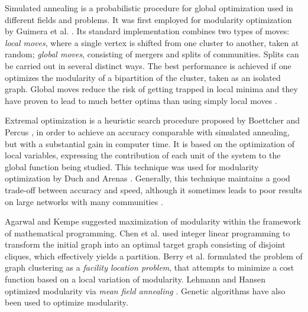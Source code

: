 Simulated annealing \cite{Kirkpatrick1983} is a probabilistic procedure for global optimization
used in different fields and problems. It was first employed for modularity optimization by Guimera et al. \cite{guimera2004}. Its
standard implementation combines two types of moves: {\em local moves}, where a single vertex is shifted from one cluster to another, taken
at random; {\em global moves}, consisting of mergers and splits of communities. Splits can be carried out in several distinct ways. The best
performance is achieved if one optimizes the modularity of a bipartition of the cluster, taken as an isolated graph. Global moves reduce the
risk of getting trapped in local minima and they have proven to lead to much better optima than using simply local moves
\cite{Massen_2005}.

 Extremal optimization is a heuristic search procedure proposed by Boettcher and Percus
\cite{Boettcher}, in order to achieve an accuracy comparable with simulated annealing, but with a substantial gain in computer time. It
is based on the optimization of local variables, expressing the contribution of each unit of the system to the global function being
studied.
This technique was used for modularity optimization by Duch and Arenas \cite{PhysRevE.72.}. Generally, this technique maintains a good
trade-off between accuracy and speed, although it sometimes leads to poor results on large networks with many communities
\cite{Fortunato201075}.

 Agarwal and Kempe \cite{Agarwal72} suggested maximization of modularity within the
framework of mathematical programming. Chen et al. \cite{Chen08} used integer linear programming to transform the initial graph into an
optimal target graph consisting of disjoint cliques, which effectively yields a partition. Berry et al. \cite{Berry} formulated
the problem of graph clustering as a {\em facility location problem}, that attempts to minimize a cost
function based on a local
variation of modularity. Lehmann and Hansen \cite{Lehmann} optimized modularity via {\em mean field annealing} \cite{Peterson:1987}. Genetic
algorithms \cite{Holland:1992} have also been used to optimize modularity.

